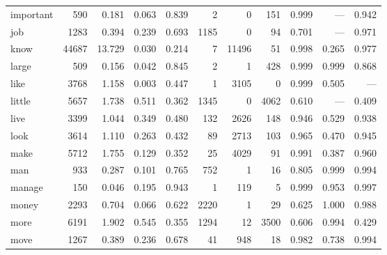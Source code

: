 \begin{landscape}
\begin{longtable}[c]{ l | r r c c | r r r | r r r }
  important  & 590   & 0.181                   & 0.063           & 0.839      & 2         & 0           & 151          & 0.999     & —           & 0.942\\
  job        & 1283  & 0.394                   & 0.239           & 0.693      & 1185      & 0           & 94           & 0.701     & —           & 0.971\\
  know       & 44687 & 13.729                  & 0.030           & 0.214      & 7         & 11496       & 51           & 0.998     & 0.265       & 0.977\\
  large      & 509   & 0.156                   & 0.042           & 0.845      & 2         & 1           & 428          & 0.999     & 0.999       & 0.868\\
  like       & 3768  & 1.158                   & 0.003           & 0.447      & 1         & 3105        & 0            & 0.999     & 0.505       & —\\
  little     & 5657  & 1.738                   & 0.511           & 0.362      & 1345      & 0           & 4062         & 0.610     & —           & 0.409\\
  live       & 3399  & 1.044                   & 0.349           & 0.480      & 132       & 2626        & 148          & 0.946     & 0.529       & 0.938\\
  look       & 3614  & 1.110                   & 0.263           & 0.432      & 89        & 2713        & 103          & 0.965     & 0.470       & 0.945\\
  make       & 5712  & 1.755                   & 0.129           & 0.352      & 25        & 4029        & 91           & 0.991     & 0.387       & 0.960\\
  man        & 933   & 0.287                   & 0.101           & 0.765      & 752       & 1           & 16           & 0.805     & 0.999       & 0.994\\
  manage     & 150   & 0.046                   & 0.195           & 0.943      & 1         & 119         & 5            & 0.999     & 0.953       & 0.997\\
  money      & 2293  & 0.704                   & 0.066           & 0.622      & 2220      & 1           & 29           & 0.625     & 1.000       & 0.988\\
  more       & 6191  & 1.902                   & 0.545           & 0.355      & 1294      & 12          & 3500         & 0.606     & 0.994       & 0.429\\
  move       & 1267  & 0.389                   & 0.236           & 0.678      & 41        & 948         & 18           & 0.982     & 0.738       & 0.994\\

\end{longtable}
\end{landscape}
